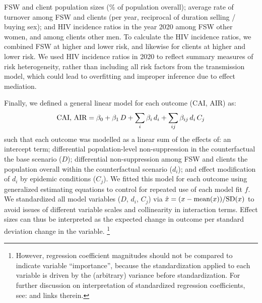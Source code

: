 FSW and client population sizes (\% of population overall);
average rate of turnover among FSW and clients (per year, reciprocal of duration selling / buying sex); and
HIV incidence ratios in the year 2020 among FSW \vs other women, and among clients \vs other men.
To calculate the HIV incidence ratios, we combined FSW at higher and lower risk,
and likewise for clients at higher and lower risk.
We used HIV incidence ratios in 2020 to reflect summary measures of risk heterogeneity,
rather than including all risk factors from the transmission model,
which could lead to overfitting and improper inference due to effect mediation.
\par
Finally, we defined a general linear model for each outcome (CAI, AIR) as:
\begin{equation}\label{eq:art.2.glm}
  \textnormal{CAI, AIR} = \beta_0
                 + \beta_1\,D
                 + \sum_i \beta_i\,d_i
                 + \sum_{ij} \beta_{ij}\,d_i\,C_j
\end{equation}
such that each outcome was modelled as a linear sum of the effects of:
an intercept term;
differential population-level non-suppression in the counterfactual \vs the base scenario ($D$);
differential non-suppression among FSW and clients
\vs the population overall within the counterfactual scenario ($d_i$); and
effect modification of $d_i$ by epidemic conditions ($C_j$).
We fitted this model for each outcome using generalized estimating equations \cite{Hojsgaard2006}
to control for repeated use of each model fit $f$.
We standardized all model variables ($D$, $d_i$, $C_j$) via
$\hat{x} = (x - \textnormal{mean}(x)) / \textnormal{SD}(x)$
to avoid issues of different variable scales and collinearity in interaction terms.
Effect sizes can thus be interpreted as
the expected change in outcome per standard deviation change in the variable.%
\footnote{However, regression coefficient magnitudes
  should not be compared to indicate variable ``importance'',
  because the standardization applied to each variable
  is driven by the (arbitrary) variance before standardization.
  For further discussion on interpretation of standardized regression coefficients, see:
   and links therein.}
